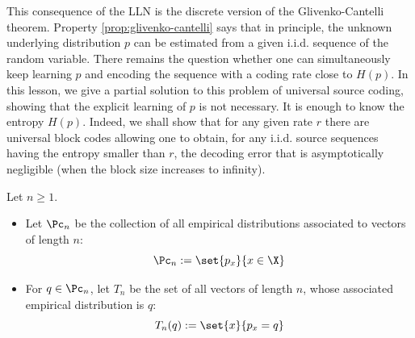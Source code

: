\documentclass[toc, titlepaged]{../cs-classes/cs-classes}
\begin{document}
\begin{remark}
    This consequence of the LLN is the discrete version of the Glivenko-Cantelli theorem. Property \ref{prop:glivenko-cantelli} says that in principle, the unknown underlying distribution $p$ can be estimated from a given i.i.d. sequence of the random variable. There remains the question whether one can simultaneously keep learning $p$ and encoding the sequence with a coding rate close to $H(p)$. In this lesson, we give a partial solution to this problem of universal source coding, showing that the explicit learning of $p$ is not necessary. It is enough to know the entropy $H(p)$. Indeed, we shall show that for any given rate $r$ there are universal block codes allowing one to obtain, for any i.i.d. source sequences having the entropy smaller than $r$, the decoding error that is asymptotically negligible (when the block size increases to infinity).
\end{remark}

\begin{definition}
    Let $n\geq1$.
    \begin{itemize}
        \item Let $\Pc_n$ be the collection of all empirical distributions associated to vectors of length $n$:
        \begin{equation*}
            \Pc_n := \set{p_x}{x\in\X}
        \end{equation*}
        \item For $q\in\Pc_n$, let $T_n$ be the set of all vectors of length $n$, whose associated empirical distribution is $q$:
        \begin{equation*}
            T_n(q) := \set{x}{p_x=q}
        \end{equation*}
    \end{itemize}
\end{definition}
\end{document}
